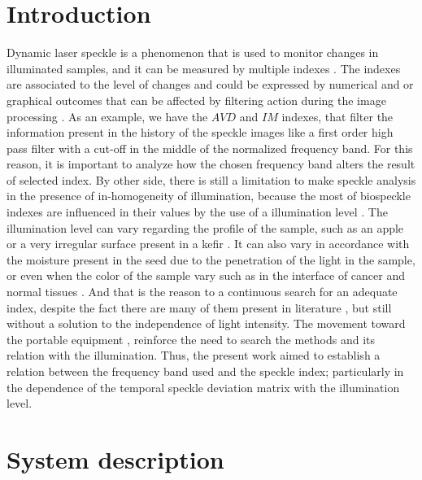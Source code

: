 \documentclass[review]{elsarticle}
\begin{document}
\section{Introduction}
Dynamic laser speckle is a phenomenon that is used to monitor changes in illuminated samples, and it can be measured by multiple indexes \cite{BSLTLBOOK}. The indexes are associated to the level of changes and could be expressed by numerical and or graphical outcomes that can be affected by filtering action during the image processing \cite{RIVERA2017144}. As an example, we have  the $AVD$ \cite{avd} and 
$IM$ \cite{ARIZAGA1999163} indexes, that filter
the information present in the history of the speckle images like a first order high pass filter with a cut-off in the middle
of the normalized frequency band. 
For this reason, it is important to analyze how
the chosen frequency band alters the result of selected index.
By other side, there is still a limitation to make  speckle analysis in the presence of in-homogeneity of illumination, because
the most of biospeckle indexes are influenced in their values
by the use of a illumination level \cite{REIS2016}.
The illumination level can vary regarding the profile of the sample, such as an apple \cite{KAZ:12a} or a very irregular surface present in a kefir \cite{kefir}. 
It can also vary in accordance with the moisture present in the seed \cite{CARDOSO2011} due to the penetration of the light in the sample, or even when the color of the sample vary such as in the interface of cancer and normal tissues \cite{BCB+:12a}. And that is the reason to a continuous search for an adequate index, despite the fact there are many of them present in literature \cite{BSLTLBOOK}, but still without a solution to the independence of light intensity. 
The movement toward the portable equipment \cite{Bra:17}, reinforce the need to search the methods and its relation with the illumination. 
Thus, the present work aimed to establish a relation between the frequency band used
and the speckle index; particularly in the dependence of
the temporal speckle deviation matrix \cite{Nothdurft:05} with the illumination level.


\section{System description}
\label{sec:description}
\end{document}
